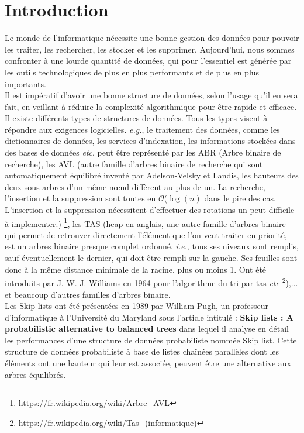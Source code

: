 \documentclass[hidelinks,a4paper,12pt]{article}
\renewcommand{\thepage}{}
\begin{document}
	
	\newpage
	\tableofcontents
	\newpage	


\renewcommand{\thepage}{\arabic{page}}
\setcounter{page}{1}


	\section{Introduction}
Le monde de l’informatique nécessite une bonne gestion des données pour pouvoir les traiter, les rechercher, les stocker et les supprimer. Aujourd'hui, nous sommes confronter à une lourde quantité de données, qui pour l’essentiel est générée par les outils technologiques de plus en plus performants et de plus en plus importants.\\[0.5cm]
Il est impératif d’avoir une bonne structure de données, selon l’usage qu’il en sera fait, en veillant à réduire la complexité algorithmique pour être rapide et efficace. Il existe différents types de structures de données. Tous les types visent à répondre aux exigences logicielles. \textit{e.g.}, le traitement des données, comme les dictionnaires de données, les services d'indexation, les informations stockées dans des bases de données \textit{etc}, peut être représenté par les ABR (Arbre binaire de recherche), les AVL (autre famille d'arbres binaire de recherche qui sont automatiquement équilibré inventé par Adelson-Velsky et Landis, les hauteurs des deux sous-arbres d'un même nœud diffèrent au plus de un. La recherche, l'insertion et la suppression sont toutes en $\mathcal{O}$($\log(n)$ dans le pire des cas. L'insertion et la suppression nécessitent d'effectuer des rotations un peut difficile à implementer.) \footnote{\url{https://fr.wikipedia.org/wiki/Arbre_AVL}}, les TAS (heap en anglais, une autre famille d'arbres binaire qui permet de retrouver directement l'élément que l'on veut traiter en priorité, est un arbres binaire presque complet ordonné. \textit{i.e.}, tous ses niveaux sont remplis, sauf éventuellement le dernier, qui doit être rempli sur la gauche. Ses feuilles sont donc à la même distance minimale de la racine, plus ou moins 1. Ont été introduits par J. W. J. Williams en 1964 pour l'algorithme du tri par tas \textit{etc} \footnote{\url{https://fr.wikipedia.org/wiki/Tas_(informatique)}}),... et beaucoup d'autres familles d'arbres binaire. \\[0.5cm]
Les Skip lists ont été présentées en 1989 par William Pugh, un professeur d’informatique à l’Université du Maryland sous l’article intitulé : \textbf{Skip lists : A probabilistic alternative to balanced trees} \cite{ArticlePugh} dans lequel il analyse en détail les performances d’une structure de données probabiliste nommée Skip list. Cette structure de données probabiliste à base de listes chaînées parallèles dont les éléments ont une hauteur qui leur est associée, peuvent être une alternative aux arbres équilibrés.\\[0.5cm]
\end{document}
